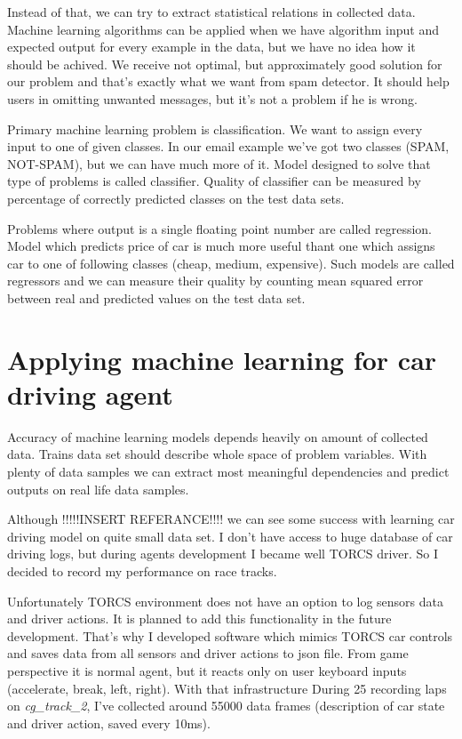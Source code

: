 \documentclass[declaration,shortabstract,english,inz]{iithesis}
\begin{document}
 Instead of that, we can try to extract statistical relations in collected data. Machine learning algorithms can be applied when we have algorithm input and expected output for every example in the data, but we have no idea how it should be achived. We receive not optimal, but approximately good solution for our problem and that's exactly what we want from spam detector. It should help users in omitting unwanted messages, but it's not a problem if he is wrong.

 Primary machine learning problem is classification. We want to assign every input to one of given classes. In our email example we've got two classes (SPAM, NOT-SPAM), but we can have much more of it. Model designed to solve that type of problems is called classifier. Quality of classifier can be measured by percentage of correctly predicted classes on the test data sets.

 Problems where output is a single floating point number are called regression. Model which predicts price of car is much more useful thant one which assigns car to one of following classes  (cheap, medium, expensive). Such models are called regressors and we can measure their quality by counting mean squared error between real and predicted values on the test data set.


\section{Applying machine learning for car driving agent}

Accuracy of machine learning models depends heavily on amount of collected data. Trains data set should describe whole space of problem variables. With plenty of data samples we can extract most meaningful dependencies and predict outputs on real life data samples. 

Although  !!!!!INSERT REFERANCE!!!! we can see some success with learning car driving model on quite small data set. I don't have access to huge database of car driving logs, but during agents development I became well TORCS driver. So I decided to record my performance on race tracks.

Unfortunately TORCS environment does not have an option to log sensors data and driver actions. It is planned to add this functionality in the future development. That's why I developed software which mimics TORCS car controls and saves data from all sensors and driver actions to json file. From game perspective it is normal agent, but it reacts only on user keyboard inputs (accelerate, break, left, right).  With that infrastructure During 25 recording laps on \textit{cg\_track\_2}, I've collected around 55000 data frames (description of car state and driver action, saved every 10ms).
\end{document}
